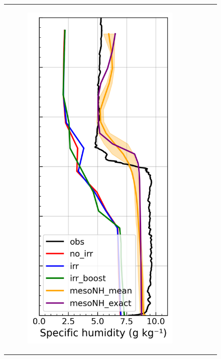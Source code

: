 \begin{figure}[hbtp]
{\begin{tabular}{@{}cccc@{}}
\begin{subfigure}[t]{0.289\textwidth}
            \includegraphics[width=\textwidth]{images/chap5/profiles/profile_elsplans_ovap_2007_.png}

\end{subfigure}
\end{tabular}}
\end{figure}
